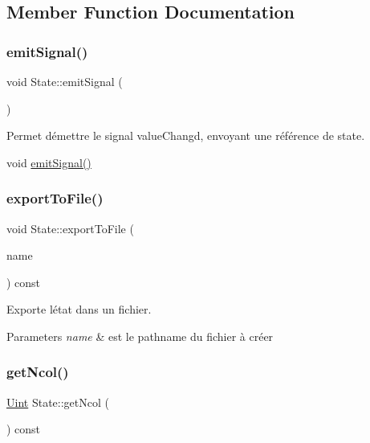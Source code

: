 \subsection{Member Function Documentation}
\mbox{\label{class_state_a7f9db12892f20438c4e00796e28a0dac}} 
\subsubsection{\texorpdfstring{emit\+Signal()}{emitSignal()}}
{\footnotesize\ttfamily void State\+::emit\+Signal (\begin{DoxyParamCaption}{ }\end{DoxyParamCaption})\hspace{0.3cm}{\ttfamily [inline]}}



Permet d\textquotesingle{}émettre le signal value\+Changd, envoyant une référence de state. 

void \mbox{\hyperlink{class_state_a7f9db12892f20438c4e00796e28a0dac}{emit\+Signal()}} \mbox{\label{class_state_a7dfee0c004e500cca7f050e800daefcf}} 
\subsubsection{\texorpdfstring{export\+To\+File()}{exportToFile()}}
{\footnotesize\ttfamily void State\+::export\+To\+File (\begin{DoxyParamCaption}\item[{Q\+String const \&}]{name }\end{DoxyParamCaption}) const}



Exporte l\textquotesingle{}état dans un fichier. 


\begin{DoxyParams}{Parameters}
{\em name} & est le pathname du fichier à créer \\
\hline
\end{DoxyParams}
\mbox{\label{class_state_a706098b5c48bcf68bfb3a8676bb5a868}} 
\subsubsection{\texorpdfstring{get\+Ncol()}{getNcol()}}
{\footnotesize\ttfamily \mbox{\hyperlink{state_8h_a4840c4503b7d10cea5e08416eb3716f1}{Uint}} State\+::get\+Ncol (\begin{DoxyParamCaption}{ }\end{DoxyParamCaption}) const}

